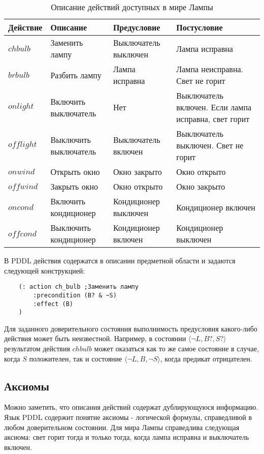 \begin{table}[h]
\begin{tabular}{l | l | l | p{4cm} }
\hline
Действие & Описание & Предусловие & Постусловие \\
\hline
$chbulb$ & Заменить лампу & Выключатель выключен & Лампа исправна \\
\hline
$brbulb$ & Разбить лампу & Лампа исправна & Лампа неисправна. Свет не
горит \\
\hline
$onlight$ & Включить выключатель & Нет & Выключатель включен. Если лампа
исправна, свет горит \\
\hline
$offlight$ & Выключить выключатель & Выключатель включен & Выключатель
выключен. Свет не горит \\
\hline
$onwind$ & Открыть окно & Окно закрыто & Окно открыто \\
\hline
$offwind$ & Закрыть окно & Окно открыто & Окно закрыто \\
\hline
$oncond$ & Включить кондиционер & Кондиционер выключен & Кондиционер
включен \\
\hline
$offcond$ & Выключить кондиционер & Кондиционер включен & Кондиционер
выключен \\
\hline
\end{tabular}
\caption{Описание действий доступных в мире Лампы}
\end{table}

В PDDL действия содержатся в описании предметной области и задаются
следующей конструкцией:

\begin{verbatim}
    (: action ch_bulb ;Заменить лампу
        :precondition (B? & ~S)
        :effect (B)
    )
\end{verbatim}

Для заданного доверительного состояния выполнимость предусловия
какого-либо действия может быть неизвестной. Например, в состоянии
$\langle\neg L, B?, S?\rangle$ результатом действия $chbulb$ может оказаться как то же самое состояние
в случае, когда $S$ положителен, так и состояние
$\langle\neg L, B, \neg S\rangle$, когда предикат отрицателен.

\subsection{Аксиомы}

Можно заметить, что описания действий содержат дублирующуюся информацию.
Язык PDDL содержит понятие аксиомы - логической формулы, справедливой в
любом доверительном состоянии. Для мира Лампы справедлива следующая
аксиома: свет горит тогда и только тогда, когда лампа исправна и
выключатель включен.

